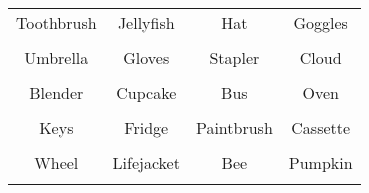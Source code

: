\documentclass[12pt,a4paper]{article}
\begin{document}
\thispagestyle{empty}
\begin{table}[]
\centering
\Huge
\begin{tabular}{cccc}
 Toothbrush& Jellyfish& Hat& Goggles\\  & & & \\
 Umbrella& Gloves& Stapler& Cloud\\  & & & \\
 Blender& Cupcake& Bus& Oven\\  & & & \\
 Keys& Fridge& Paintbrush& Cassette\\  & & & \\
 Wheel& Lifejacket& Bee& Pumpkin\\  & & & \\
\end{tabular}
\end{table}
\end{document}
